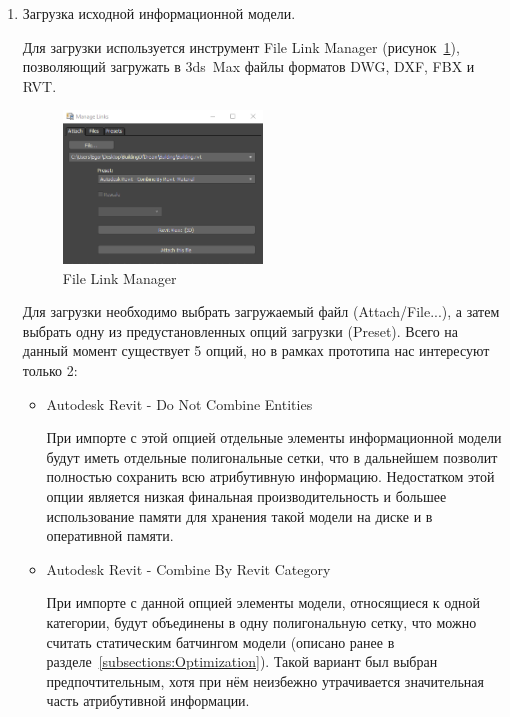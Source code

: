\begin{enumerate}
    \item {
        Загрузка исходной информационной модели.

        Для загрузки используется инструмент File Link Manager
        (рисунок~\ref{figure:3DCMax-FileLinkManager}),
        позволяющий загружать в 3ds~Max файлы форматов DWG, DXF, FBX и RVT.
        \begin{figure}[ht]
            \centering
            \includegraphics[width=0.5\textwidth, frame]{images/3DSMax-FLM.png}
            \caption{File Link Manager}
            \label{figure:3DCMax-FileLinkManager}
        \end{figure}
        Для загрузки необходимо выбрать загружаемый файл (Attach/File...),
        а затем выбрать одну из предустановленных опций загрузки (Preset).
        Всего на данный момент существует 5 опций,
        но в рамках прототипа нас интересуют только 2:

        \begin{itemize}
            \item {
                Autodesk Revit - Do Not Combine Entities

                При импорте с этой опцией отдельные элементы информационной модели
                будут иметь отдельные полигональные сетки, что в дальнейшем
                позволит полностью сохранить всю атрибутивную информацию.
                Недостатком этой опции является низкая финальная производительность
                и большее использование памяти для хранения такой модели
                на диске и в оперативной памяти.
            }
            \item {
                Autodesk Revit - Combine By Revit Category

                При импорте с данной опцией элементы модели, относящиеся к одной категории,
                будут объединены в одну полигональную сетку, что можно считать
                статическим батчингом модели (описано ранее
                в разделе~\ref{subsections:Optimization}).
                Такой вариант был выбран предпочтительным,
                хотя при нём неизбежно утрачивается
                значительная часть атрибутивной информации.
            }
        \end{itemize}

}
\end{enumerate}
